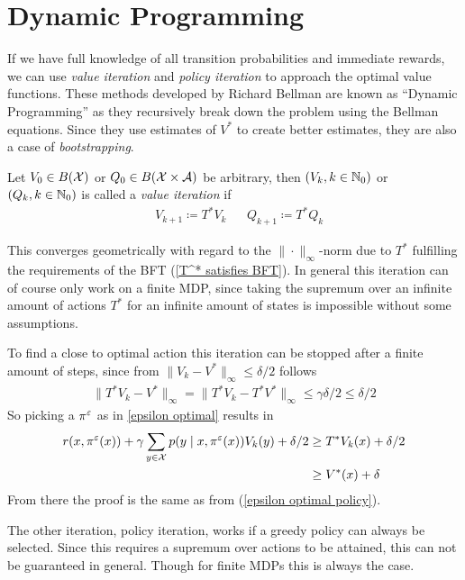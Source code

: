 \section{Dynamic Programming}

If we have full knowledge of all transition probabilities and immediate rewards, we can use \emph{value iteration} and \emph{policy iteration} to approach the optimal value functions. These methods developed by Richard Bellman are known as ``Dynamic Programming'' as they recursively break down the problem using the Bellman equations. Since they use estimates of \(V^*\) to create better estimates, they are also a case of \emph{bootstrapping}.

\begin{definition}Let \(V_0 \in B(\mathcal{X})\) or \(Q_0 \in B(\mathcal{X}\times\mathcal{A})\) be arbitrary, then \((V_k, k\in\mathbb{N}_0)\) or \((Q_k, k\in\mathbb{N}_0)\) is called a \emph{value iteration} if
	\begin{align*}
		&V_{k+1}\coloneqq T^* V_k && Q_{k+1}\coloneqq T^* Q_k
	\end{align*}
\end{definition}
This converges geometrically with regard to the \(\|\cdot\|_\infty\)-norm due to \(T^*\) fulfilling the requirements of the BFT (\ref{T^* satisfies BFT}). In general this iteration can of course only work on a finite MDP, since taking the supremum over an infinite amount of actions \(T^*\) for an infinite amount of states is impossible without some assumptions.

To find a close to optimal action this iteration can be stopped after a finite amount of steps, since from \(\|V_k-V^*\|_\infty\le \delta/2\) follows
\begin{align*}
	\|T^* V_k - V^*\|_\infty=\|T^*V_{k} -T^*V^*\|_\infty\le \gamma \delta/2 \le \delta/2
\end{align*}
So picking a \(\pi^\varepsilon\) as in \ref{epsilon optimal} results in
\begin{align*}
	r(x,\pi^\varepsilon(x))+\gamma \sum_{y\in\mathcal{X}}p(y\mid x, \pi^\varepsilon(x))V_k(y) +\delta/2 
	&\ge T^* V_k(x) + \delta/2 \\
	&\ge V^*(x) + \delta
\end{align*}
From there the proof is the same as from (\ref{epsilon optimal policy}).

The other iteration, policy iteration, works if a greedy policy can always be selected. Since this requires a supremum over actions to be attained, this can not be guaranteed in general. Though for finite MDPs this is always the case. 
 
